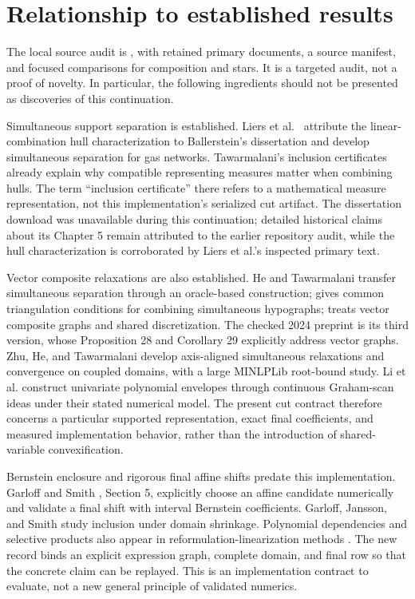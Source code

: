 \section{Relationship to established results}\label{sec:literature}

The local source audit is
, with retained
primary documents, a source manifest, and focused comparisons for
composition and stars. It is a targeted audit, not a proof of novelty.
In particular, the following ingredients should not be presented as
discoveries of this continuation.

Simultaneous support separation is established. Liers et
al.\ \cite{LiersEtAl2021} attribute the linear-combination hull
characterization to Ballerstein's dissertation
\cite{Ballerstein2013} and develop simultaneous separation for gas
networks. Tawarmalani's inclusion certificates
\cite{Tawarmalani2010} already explain why compatible representing
measures matter when combining hulls. The term ``inclusion certificate''
there refers to a mathematical measure representation, not this
implementation's serialized cut artifact. The dissertation download
was unavailable during this continuation; detailed historical claims
about its Chapter 5 remain attributed to the earlier repository audit,
while the hull characterization is corroborated by Liers et al.'s
inspected primary text.

Vector composite relaxations are also established. He and Tawarmalani
\cite{HeTawarmalani2021} transfer simultaneous separation through an
oracle-based construction; \cite{HeTawarmalani2022} gives common
triangulation conditions for combining simultaneous hypographs;
\cite{HeTawarmalani2024} treats vector composite graphs and shared
discretization. The checked 2024 preprint is its third version, whose
Proposition 28 and Corollary 29 explicitly address vector graphs.
Zhu, He, and Tawarmalani \cite{ZhuHeTawarmalani2026} develop
axis-aligned simultaneous relaxations and convergence on coupled
domains, with a large MINLPLib root-bound study. Li et al.
\cite{LiEtAl2026} construct univariate polynomial envelopes through
continuous Graham-scan ideas under their stated numerical model.
The present cut contract therefore concerns a particular supported
representation, exact final coefficients, and measured implementation
behavior, rather than the introduction of shared-variable convexification.

Bernstein enclosure and rigorous final affine shifts predate this
implementation. Garloff and Smith \cite{GarloffSmith2008}, Section 5,
explicitly choose an affine candidate numerically and validate a final
shift with interval Bernstein coefficients. Garloff, Jansson, and Smith
\cite{GarloffJanssonSmith2003} study inclusion under domain shrinkage.
Polynomial dependencies and selective products also appear in
reformulation-linearization methods \cite{SheraliTuncbilek1997}.
The new record binds an explicit expression graph, complete domain,
and final row so that the concrete claim can be replayed. This is an
implementation contract to evaluate, not a new general principle of
validated numerics.

